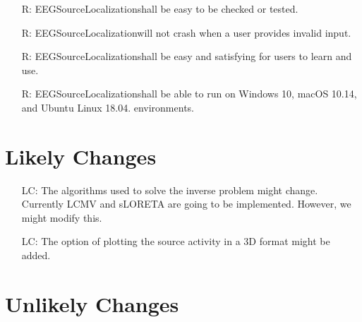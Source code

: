\documentclass[12pt]{article}
\newcounter{reqnum} %
\newcounter{lcnum} %
\renewcommand{\progname}{EEGSourceLocalization}
\begin{document}
\noindent \begin{itemize}

\item[R\refstepcounter{reqnum}\thereqnum \label{R_Output}:] \progname shall be easy to be checked or tested.

\item[R\refstepcounter{reqnum}\thereqnum \label{R_Output}:] \progname will not crash when a user provides invalid input.

\item[R\refstepcounter{reqnum}\thereqnum \label{R_Output}:] \progname shall be easy and satisfying for users to learn and use.

\item[R\refstepcounter{reqnum}\thereqnum \label{R_Output}:] \progname shall be able to run on Windows 10, macOS 10.14, and Ubuntu Linux 18.04. environments.

\end{itemize}

\section{Likely Changes}    

\noindent \begin{itemize}

\item[LC\refstepcounter{lcnum}\thelcnum\label{LC_meaningfulLabel}:] The algorithms used to solve the inverse problem might change. Currently LCMV and sLORETA are going to be implemented. However, we might modify this.

\item[LC\refstepcounter{lcnum}\thelcnum\label{LC_meaningfulLabel}:] The option of plotting the source activity in a 3D format might be added.


\end{itemize}

\section{Unlikely Changes}    
\end{document}
